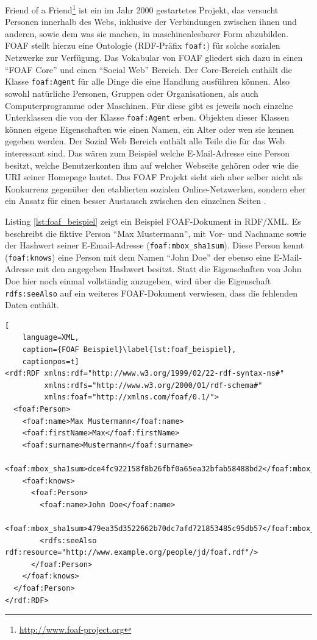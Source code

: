 Friend of a Friend\footnote{\url{http://www.foaf-project.org}} ist ein im Jahr 2000 gestartetes Projekt, das versucht Personen innerhalb des Webs, inklusive der Verbindungen zwischen ihnen und anderen, sowie dem was sie machen, in maschinenlesbarer Form abzubilden. FOAF stellt hierzu eine Ontologie \cite{Brickley2010} (RDF-Präfix \texttt{foaf:}) für solche sozialen Netzwerke zur Verfügung. Das Vokabular von FOAF gliedert sich dazu in einen \enquote{FOAF Core} und einen \enquote{Social Web} Bereich. Der Core-Bereich enthält die Klasse \texttt{foaf:Agent} für alle Dinge die eine Handlung ausführen können. Also sowohl natürliche Personen, Gruppen oder Organisationen, als auch Computerprogramme oder Maschinen. Für diese gibt es jeweils noch einzelne Unterklassen die von der Klasse \texttt{foaf:Agent} erben. Objekten dieser Klassen können eigene Eigenschaften wie einen Namen, ein Alter oder wen sie kennen gegeben werden. Der Sozial Web Bereich enthält alle Teile die für das Web interessant sind. Das wären zum Beispiel welche E-Mail-Adresse eine Person besitzt, welche Benutzerkonten ihm auf welcher Webseite gehören oder wie die URI seiner Homepage lautet. Das FOAF Projekt sieht sich aber selber nicht als Konkurrenz gegenüber den etablierten sozialen Online-Netzwerken, sondern eher ein Ansatz für einen besser Austausch zwischen den einzelnen Seiten \cite[siehe \enquote{Abstract}]{Brickley2010}.

Listing \ref{lst:foaf_beispiel} zeigt ein Beispiel FOAF-Dokument in RDF/XML. Es beschreibt die fiktive Person \enquote{Max Mustermann}, mit Vor- und Nachname sowie der Hashwert seiner E-Email-Adresse (\texttt{foaf:mbox\_sha1sum}). Diese Person kennt (\texttt{foaf:knows}) eine Person mit dem Namen \enquote{John Doe} der ebenso eine E-Mail-Adresse mit den angegeben Hashwert besitzt. Statt die Eigenschaften von John Doe hier noch einmal vollständig anzugeben, wird über die Eigenschaft \texttt{rdfs:seeAlso} auf ein weiteres FOAF-Dokument verwiesen, dass die fehlenden Daten enthält. 

\begin{lstlisting}[
    language=XML,
    caption={FOAF Beispiel}\label{lst:foaf_beispiel},
    captionpos=t]
<rdf:RDF xmlns:rdf="http://www.w3.org/1999/02/22-rdf-syntax-ns#"
         xmlns:rdfs="http://www.w3.org/2000/01/rdf-schema#"
         xmlns:foaf="http://xmlns.com/foaf/0.1/">
  <foaf:Person>
    <foaf:name>Max Mustermann</foaf:name>
    <foaf:firstName>Max</foaf:firstName>
    <foaf:surname>Mustermann</foaf:surname>
    <foaf:mbox_sha1sum>dce4fc922158f8b26fbf0a65ea32bfab58488bd2</foaf:mbox_sha1sum>
    <foaf:knows>
      <foaf:Person>
        <foaf:name>John Doe</foaf:name>
        <foaf:mbox_sha1sum>479ea35d3522662b70dc7afd721853485c95db57</foaf:mbox_sha1sum>
        <rdfs:seeAlso rdf:resource="http://www.example.org/people/jd/foaf.rdf"/>
      </foaf:Person>
    </foaf:knows>
  </foaf:Person>
</rdf:RDF>
\end{lstlisting}

